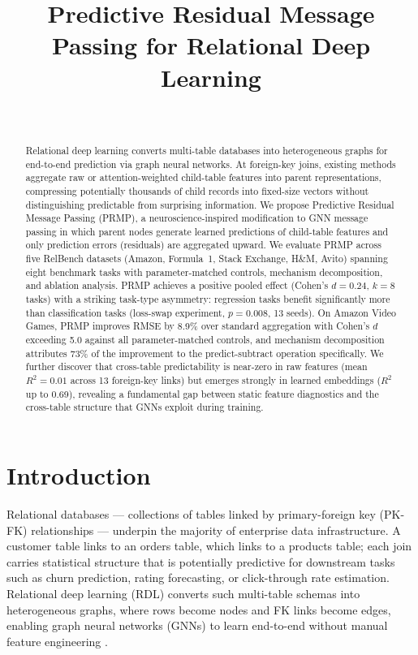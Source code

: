 \documentclass[11pt,letterpaper]{article}
\title{Predictive Residual Message Passing for Relational Deep Learning}
\author{~}
\date{}
\begin{document}
\maketitle

\begin{abstract}
Relational deep learning converts multi-table databases into heterogeneous graphs for end-to-end prediction via graph neural networks. At foreign-key joins, existing methods aggregate raw or attention-weighted child-table features into parent representations, compressing potentially thousands of child records into fixed-size vectors without distinguishing predictable from surprising information. We propose Predictive Residual Message Passing (PRMP), a neuroscience-inspired modification to GNN message passing in which parent nodes generate learned predictions of child-table features and only prediction errors (residuals) are aggregated upward. We evaluate PRMP across five RelBench datasets (Amazon, Formula~1, Stack Exchange, H\&M, Avito) spanning eight benchmark tasks with parameter-matched controls, mechanism decomposition, and ablation analysis. PRMP achieves a positive pooled effect (Cohen's $d = 0.24$, $k = 8$ tasks) with a striking task-type asymmetry: regression tasks benefit significantly more than classification tasks (loss-swap experiment, $p = 0.008$, 13 seeds). On Amazon Video Games, PRMP improves RMSE by 8.9\% over standard aggregation with Cohen's $d$ exceeding 5.0 against all parameter-matched controls, and mechanism decomposition attributes 73\% of the improvement to the predict-subtract operation specifically. We further discover that cross-table predictability is near-zero in raw features (mean $R^2 = 0.01$ across 13 foreign-key links) but emerges strongly in learned embeddings ($R^2$ up to 0.69), revealing a fundamental gap between static feature diagnostics and the cross-table structure that GNNs exploit during training.
\end{abstract}

\section{Introduction}
\label{sec:introduction}

Relational databases --- collections of tables linked by primary-foreign key (PK-FK) relationships --- underpin the majority of enterprise data infrastructure. A customer table links to an orders table, which links to a products table; each join carries statistical structure that is potentially predictive for downstream tasks such as churn prediction, rating forecasting, or click-through rate estimation. Relational deep learning (RDL) \citep{Fey2024} converts such multi-table schemas into heterogeneous graphs, where rows become nodes and FK links become edges, enabling graph neural networks (GNNs) to learn end-to-end without manual feature engineering \citep{Robinson2024}.
\end{document}
